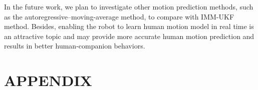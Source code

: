 \documentclass[letterpaper, 10 pt, conference]{ieeeconf}
\begin{document}
In the future work, we plan to investigate other motion prediction methods, such as the autoregressive–moving-average method, to compare with IMM-UKF method.
Besides,  enabling the robot to learn human motion model in real time is an attractive topic and may provide more accurate human motion prediction and results in better human-companion behaviors.









\section{APPENDIX}
 
\end{document}
